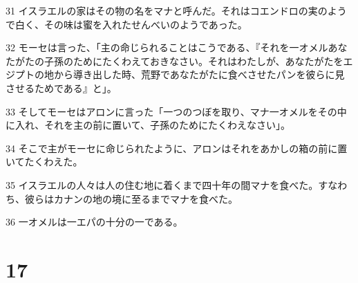\par 31 イスラエルの家はその物の名をマナと呼んだ。それはコエンドロの実のようで白く、その味は蜜を入れたせんべいのようであった。
\par 32 モーセは言った、「主の命じられることはこうである、『それを一オメルあなたがたの子孫のためにたくわえておきなさい。それはわたしが、あなたがたをエジプトの地から導き出した時、荒野であなたがたに食べさせたパンを彼らに見させるためである』と」。
\par 33 そしてモーセはアロンに言った「一つのつぼを取り、マナ一オメルをその中に入れ、それを主の前に置いて、子孫のためにたくわえなさい」。
\par 34 そこで主がモーセに命じられたように、アロンはそれをあかしの箱の前に置いてたくわえた。
\par 35 イスラエルの人々は人の住む地に着くまで四十年の間マナを食べた。すなわち、彼らはカナンの地の境に至るまでマナを食べた。
\par 36 一オメルは一エパの十分の一である。

\chapter{17}

